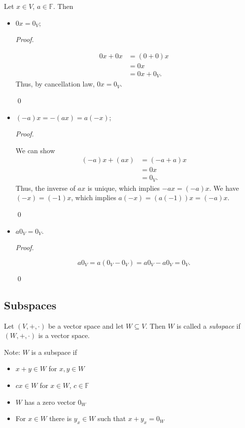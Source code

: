 \documentclass[12pt]{article}
\newenvironment{theorem}[2][Theorem]{\begin{trivlist}
\item[\hskip \labelsep {\bfseries #1}\hskip \labelsep {\bfseries #2.}]}{\end{trivlist}}
\newenvironment{definition}[2][Definition]{\begin{trivlist}
\item[\hskip \labelsep {\bfseries #1}\hskip \labelsep {\bfseries #2}]}{\end{trivlist}}
\newenvironment{sol}
    {\emph{Proof.}
    }
    {
    \qed
    }
\begin{document}
\begin{theorem}{1.2}
Let $x \in V$, $a \in \mathbb{F}$. Then
\begin{itemize}
    \item $0x = 0_V$;
    
    \begin{sol}
    \begin{align*}
        0x + 0x &= (0 + 0)x \\
        &= 0x \\
        &= 0x + 0_V.
    \end{align*}
    Thus, by cancellation law, $0x = 0_V$.
    \end{sol}
    
    \item $(-a)x = -(ax) = a(-x)$;
    
    \begin{sol}
    We can show
    \begin{align*}
        (-a)x + (ax) &= (-a + a)x \\
        &= 0x \\
        &= 0_V.
    \end{align*}
    Thus, the inverse of $ax$ is unique, which implies $-ax = (-a)x$. We have $(-x) = (-1)x$, which implies $a(-x) = (a(-1))x = (-a)x$.
    \end{sol}
    
    \item $a0_V = 0_V$.
    
    \begin{sol}
    $$a0_V = a(0_V - 0_V) = a0_V - a0_V = 0_V.$$
    \end{sol}
\end{itemize}
\end{theorem}

\subsection{Subspaces}

\begin{definition}{2}
Let $(V, +, \cdot)$ be a vector space and let $W \subseteq V$. Then $W$ is called a \textit{subspace} if $(W, +, \cdot)$ is a vector space.
\end{definition}

\noindent Note: $W$ is a subspace if
\begin{itemize}
    \item $x + y \in W$ for $x,y \in W$
    \item $cx \in W$ for $x \in W$, $c \in \mathbb{F}$
    \item $W$ has a zero vector $0_W$
    \item For $x \in W$ there is $y_x \in W$ such that $x + y_x = 0_W$
\end{itemize}
\end{document}
